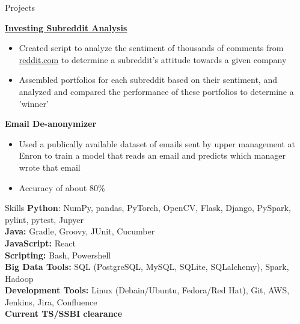 \documentclass[12pt]{resumeclass}
\begin{document}
\vspace{18pt}
\resumesect
    {Projects}
    {\href{https://github.com/erkearney/investing-subreddit-analysis}{\textbf{Investing
    Subreddit Analysis}}
    \begin{itemize}[noitemsep,nolistsep]
	\item Created script to analyze the sentiment of thousands of comments
	from \href{reddit.com}{reddit.com} to determine a subreddit's attitude towards a given
	company
	\item Assembled portfolios for each subreddit based on their sentiment,
	and analyzed and compared the performance of these portfolios to
	determine a 'winner'
    \end{itemize}

    \vspace{3pt}
    \textbf{Email De-anonymizer}
    {\begin{itemize}[noitemsep,nolistsep]
	\item Used a publically available dataset of emails sent by upper management at Enron to train a model that reads an email and predicts which manager wrote that email
	\item Accuracy of about 80\%
    \end{itemize}}}


\vspace{18pt}
\resumesect
    {Skills}
    {
    \textbf{Python}: NumPy, pandas, PyTorch, OpenCV, Flask, Django, PySpark,
    pylint, pytest, Jupyer\\
    \textbf{Java:} Gradle, Groovy, JUnit, Cucumber\\
    \textbf{JavaScript:} React\\
    \textbf{Scripting:} Bash, Powershell\\
    \textbf{Big Data Tools:} SQL (PostgreSQL, MySQL, SQLite,
    SQLalchemy), Spark, Hadoop\\
    \textbf{Development Tools:} Linux (Debain/Ubuntu, Fedora/Red Hat), Git, AWS,
    Jenkins, Jira, Confluence\\
    \textbf{Current TS/SSBI clearance}}
\end{document}
